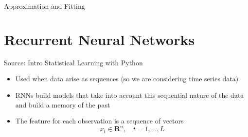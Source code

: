 \begin{chapter}{Approximation and Fitting}
    \section{Recurrent Neural Networks}
    Source: Intro Statistical Learning with Python
    \begin{itemize}
        \item Used when data arise as sequences (so we are considering time series data)
        \item RNNs build models that take into account this sequential nature of the data and build a memory of the past
        \item The feature for each observation is a sequence of vectors
            \[x_t \in \mathbf{R}^n, \quad t=1, \ldots, L\]
    \end{itemize}

    
\end{chapter}